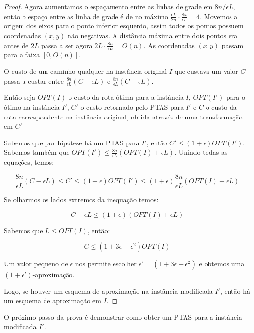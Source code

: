 \begin{proof}
Agora aumentamos o espaçamento entre as linhas de grade em $8n/\epsilon L$, então o espaço entre as linha de grade é de no máximo $ \frac{\epsilon L}{ 2n} \cdot \frac{8n}{\epsilon L} = 4 $. Movemos a origem dos eixos para o ponto inferior esquerdo, assim todos os pontos possuem coordenadas $(x,y)$ não negativas. A distância máxima entre dois pontos era antes de $ 2 L$ passa a ser agora $ 2 L \cdot \frac{8n}{\epsilon L} = O(n)$. As coordenadas $(x,y)$ passam para a faixa $[0,O(n)]$. 

O custo de um caminho qualquer na instância original $I$ que custava um valor $C$ passa a custar entre $\frac{8n}{\epsilon L} (C - \epsilon L)$ e $\frac{8n}{\epsilon L} (C + \epsilon L)$.

Então seja $OPT(I)$ o custo da rota ótima para a instância $I$, $OPT(I')$ para o ótimo na instância $I'$, $C'$ o custo retornado pelo PTAS para $I'$ e $C$ o custo da rota correspondente na instância original, obtida através de uma transformação em $C'$.

Sabemos que por hipótese há um PTAS para $I'$, então $C' \leq (1+\epsilon) OPT(I')$. Sabemos também que $OPT(I') \leq  \frac{8n}{\epsilon L} (OPT(I) + \epsilon L)$. Unindo todas as equações, temos:

\begin{equation}
\frac{8n}{\epsilon L} (C - \epsilon L) \leq C' \leq (1+\epsilon) OPT(I') \leq (1+\epsilon) \frac{8n}{\epsilon L} (OPT(I) + \epsilon L)
\end{equation}

Se olharmos os lados extremos da inequação temos:

\begin{equation}
C - \epsilon L \leq (1+\epsilon)(OPT(I) + \epsilon L)
\end{equation}

Sabemos que $L \leq OPT(I)$, então:

\begin{equation}
C \leq (1 + 3 \epsilon + \epsilon^2) OPT(I)
\end{equation}

Um valor pequeno de $\epsilon$ nos permite escolher $\epsilon' = (1 + 3 \epsilon + \epsilon^2)$ e obtemos uma $(1 + \epsilon')$-aproximação.

Logo, se houver um esquema de aproximação na instância modificada $I'$, então há um esquema de aproximação em $I$.

\end{proof}

O próximo passo da prova é demonstrar como obter um PTAS para a instância modificada $I'$.

